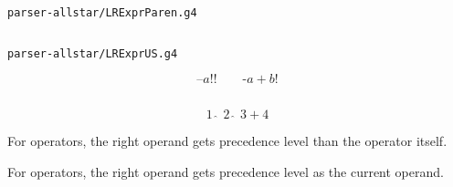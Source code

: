 \begin{frame}{}
  \begin{center}
    \texttt{parser-allstar/LRExprParen.g4}
  \end{center}

  \vspace{0.30cm}
  \begin{columns}
      \pause
  \end{columns}
\end{frame}

\begin{frame}{}
  \begin{center}
    \texttt{parser-allstar/LRExprUS.g4}

    \vspace{0.30cm}
  \end{center}
\end{frame}

\begin{frame}{}
  \begin{center}
  \end{center}

  \[
    \text{--}a!! \qquad \text{-}a+b!
  \]
\end{frame}

\begin{frame}{}
  \begin{columns}
      \pause
  \end{columns}

  \vspace{0.80cm}
  \[
    1 \;\hat{\;}\; 2 \;\hat{\;}\; 3 + 4
  \]
\end{frame}

\begin{frame}{}
  \begin{center}
    For  operators, the right operand
    gets  precedence level than the operator itself.
  \end{center}

  \vspace{0.30cm}
  \begin{center}
  \end{center}

  \vspace{0.10cm}
  \begin{center}
    For  operators, the right operand
    gets  precedence level as the current operand.
  \end{center}
\end{frame}
